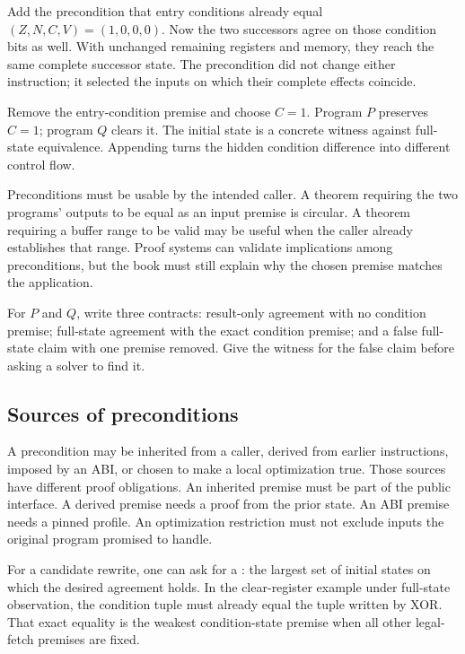 Add the precondition that entry conditions already equal
\((Z,N,C,V)=(1,0,0,0)\). Now the two successors agree on those condition bits
as well. With unchanged remaining registers and memory, they reach the same
complete successor state. The precondition did not change either instruction;
it selected the inputs on which their complete effects coincide.

\begin{example}[title={Removing one premise produces a witness}]
Remove the entry-condition premise and choose \(C=1\). Program \(P\) preserves
\(C=1\); program \(Q\) clears it. The initial state is a concrete witness
against full-state equivalence. Appending  turns the hidden
condition difference into different control flow.
\end{example}

Preconditions must be usable by the intended caller. A theorem requiring the
two programs' outputs to be equal as an input premise is circular. A theorem
requiring a buffer range to be valid may be useful when the caller already
establishes that range. Proof systems can validate implications among
preconditions, but the book must still explain why the chosen premise matches
the application.

\begin{tryit}[title={Strengthen and weaken a claim}]
For \(P\) and \(Q\), write three contracts: result-only agreement with no
condition premise; full-state agreement with the exact condition premise; and
a false full-state claim with one premise removed. Give the witness for the
false claim before asking a solver to find it.
\end{tryit}

\subsection{Sources of preconditions}

A precondition may be inherited from a caller, derived from earlier
instructions, imposed by an ABI, or chosen to make a local optimization true.
Those sources have different proof obligations. An inherited premise must be
part of the public interface. A derived premise needs a proof from the prior
state. An ABI premise needs a pinned profile. An optimization restriction must
not exclude inputs the original program promised to handle.

For a candidate rewrite, one can ask for a : the
largest set of initial states on which the desired agreement holds. In the
clear-register example under full-state observation, the condition tuple
must already equal the tuple written by XOR. That exact equality is the
weakest condition-state premise when all other legal-fetch premises are fixed.


